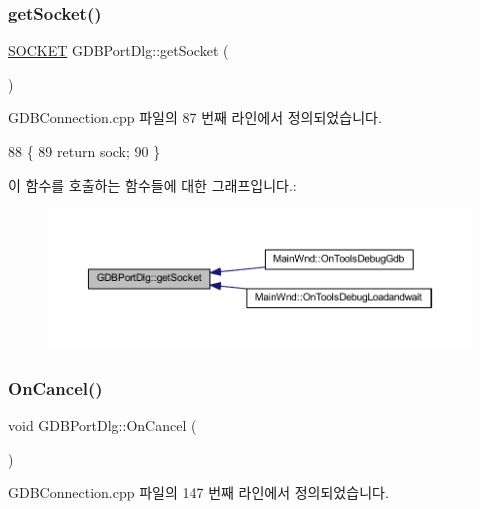\subsubsection{\texorpdfstring{get\+Socket()}{getSocket()}}
{\footnotesize\ttfamily \mbox{\hyperlink{remote_8cpp_aff55fe551a9992a54ec54621c524d0a4}{S\+O\+C\+K\+ET}} G\+D\+B\+Port\+Dlg\+::get\+Socket (\begin{DoxyParamCaption}{ }\end{DoxyParamCaption})}



G\+D\+B\+Connection.\+cpp 파일의 87 번째 라인에서 정의되었습니다.


\begin{DoxyCode}
88 \{
89   \textcolor{keywordflow}{return} sock;
90 \}
\end{DoxyCode}
이 함수를 호출하는 함수들에 대한 그래프입니다.\+:
\nopagebreak
\begin{figure}[H]
\begin{center}
\leavevmode
\includegraphics[width=350pt]{class_g_d_b_port_dlg_a6319081133e78827d9dfb6c287d88068_icgraph}
\end{center}
\end{figure}
\mbox{\label{class_g_d_b_port_dlg_aec825d9c81585a57a4951fe68940293d}} 
\subsubsection{\texorpdfstring{On\+Cancel()}{OnCancel()}}
{\footnotesize\ttfamily void G\+D\+B\+Port\+Dlg\+::\+On\+Cancel (\begin{DoxyParamCaption}{ }\end{DoxyParamCaption})\hspace{0.3cm}{\ttfamily [protected]}}



G\+D\+B\+Connection.\+cpp 파일의 147 번째 라인에서 정의되었습니다.


